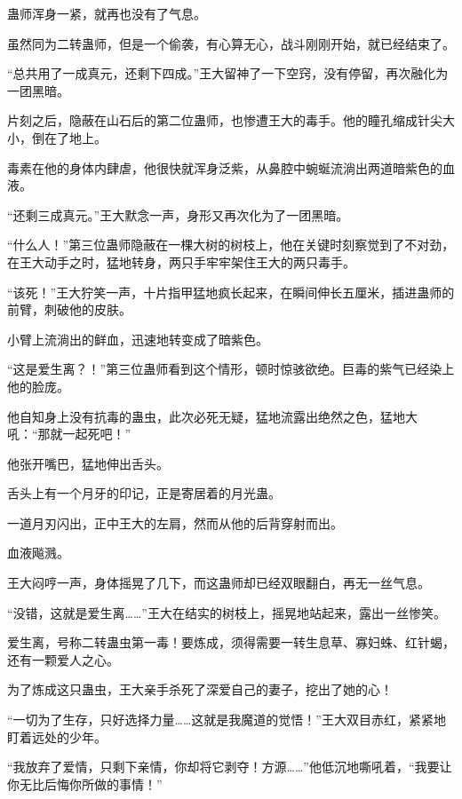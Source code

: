 \begin{this_body}
蛊师浑身一紧，就再也没有了气息。

虽然同为二转蛊师，但是一个偷袭，有心算无心，战斗刚刚开始，就已经结束了。

“总共用了一成真元，还剩下四成。”王大留神了一下空窍，没有停留，再次融化为一团黑暗。

片刻之后，隐蔽在山石后的第二位蛊师，也惨遭王大的毒手。他的瞳孔缩成针尖大小，倒在了地上。

毒素在他的身体内肆虐，他很快就浑身泛紫，从鼻腔中蜿蜒流淌出两道暗紫色的血液。

“还剩三成真元。”王大默念一声，身形又再次化为了一团黑暗。

“什么人！”第三位蛊师隐蔽在一棵大树的树枝上，他在关键时刻察觉到了不对劲，在王大动手之时，猛地转身，两只手牢牢架住王大的两只毒手。

“该死！”王大狞笑一声，十片指甲猛地疯长起来，在瞬间伸长五厘米，插进蛊师的前臂，刺破他的皮肤。

小臂上流淌出的鲜血，迅速地转变成了暗紫色。

“这是爱生离？！”第三位蛊师看到这个情形，顿时惊骇欲绝。巨毒的紫气已经染上他的脸庞。

他自知身上没有抗毒的蛊虫，此次必死无疑，猛地流露出绝然之色，猛地大吼：“那就一起死吧！”

他张开嘴巴，猛地伸出舌头。

舌头上有一个月牙的印记，正是寄居着的月光蛊。

一道月刃闪出，正中王大的左肩，然而从他的后背穿射而出。

血液飚溅。

王大闷哼一声，身体摇晃了几下，而这蛊师却已经双眼翻白，再无一丝气息。

“没错，这就是爱生离……”王大在结实的树枝上，摇晃地站起来，露出一丝惨笑。

爱生离，号称二转蛊虫第一毒！要炼成，须得需要一转生息草、寡妇蛛、红针蝎，还有一颗爱人之心。

为了炼成这只蛊虫，王大亲手杀死了深爱自己的妻子，挖出了她的心！

“一切为了生存，只好选择力量……这就是我魔道的觉悟！”王大双目赤红，紧紧地盯着远处的少年。

“我放弃了爱情，只剩下亲情，你却将它剥夺！方源……”他低沉地嘶吼着，“我要让你无比后悔你所做的事情！”

\end{this_body}

